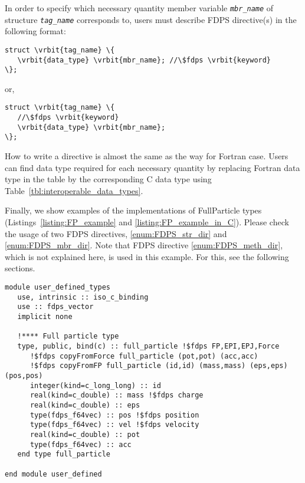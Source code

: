 In order to specify which necessary quantity member variable \textit{\texttt{mbr\_name}} of structure \textit{\texttt{tag\_name}} corresponds to, users must describe FDPS directive(s) in the following format:
\begin{screen}
\begin{Verbatim}[commandchars=\\\{\}]
struct \vrbit{tag_name} \{
   \vrbit{data_type} \vrbit{mbr_name}; //\$fdps \vrbit{keyword}
\};
\end{Verbatim}
\end{screen}

or,

\begin{screen}
\begin{Verbatim}[commandchars=\\\{\}]
struct \vrbit{tag_name} \{
   //\$fdps \vrbit{keyword}
   \vrbit{data_type} \vrbit{mbr_name};
\};
\end{Verbatim}
\end{screen}

How to write a directive is almost the same as the way for Fortran case. Users can find data type required for each necessary quantity by replacing Fortran data type in the table by the corresponding C data type using Table~\ref{tbl:interoperable_data_types}.

Finally, we show examples of the implementations of FullParticle types (Listings~\ref{listing:FP_example} and \ref{listing:FP_example_in_C}). Please check the usage of two FDPS directives,  \ref{enum:FDPS_str_dir} and \ref{enum:FDPS_mbr_dir}. Note that FDPS directive \ref{enum:FDPS_meth_dir}, which is not explained here, is used in this example. For this, see the following sections.

\begin{lstlisting}[caption=An example of the implementation of an user-defined type (Fortran),label=listing:FP_example]
module user_defined_types
   use, intrinsic :: iso_c_binding
   use :: fdps_vector
   implicit none
   
   !**** Full particle type
   type, public, bind(c) :: full_particle !$fdps FP,EPI,EPJ,Force
      !$fdps copyFromForce full_particle (pot,pot) (acc,acc)
      !$fdps copyFromFP full_particle (id,id) (mass,mass) (eps,eps) (pos,pos) 
      integer(kind=c_long_long) :: id
      real(kind=c_double) :: mass !$fdps charge
      real(kind=c_double) :: eps
      type(fdps_f64vec) :: pos !$fdps position
      type(fdps_f64vec) :: vel !$fdps velocity
      real(kind=c_double) :: pot
      type(fdps_f64vec) :: acc
   end type full_particle

end module user_defined
\end{lstlisting}


